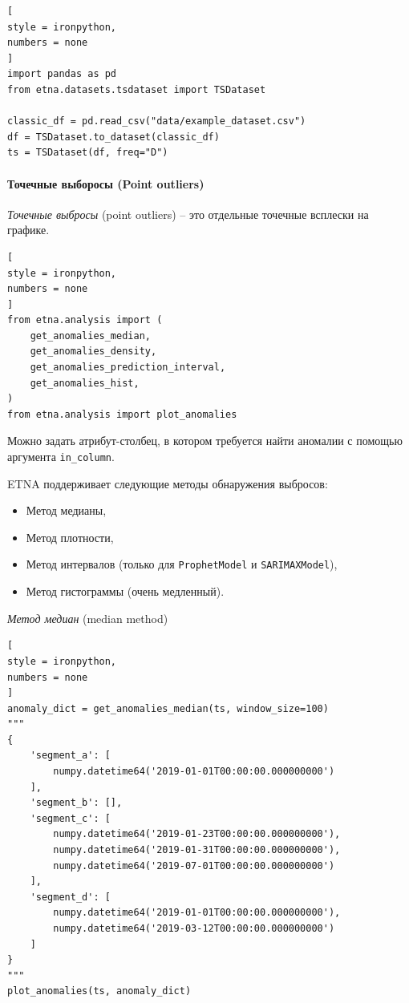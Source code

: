 \documentclass[%
	11pt,
	a4paper,
	utf8,
		]{article}
\begin{document}
\begin{lstlisting}[
style = ironpython,
numbers = none
]
import pandas as pd
from etna.datasets.tsdataset import TSDataset

classic_df = pd.read_csv("data/example_dataset.csv")
df = TSDataset.to_dataset(classic_df)
ts = TSDataset(df, freq="D")
\end{lstlisting}

\paragraph{Точечные выборосы (Point outliers)}

\emph{Точечные выбросы} (point outliers) -- это отдельные точечные всплески на графике.

\begin{lstlisting}[
style = ironpython,
numbers = none
]
from etna.analysis import (
	get_anomalies_median,
	get_anomalies_density,
	get_anomalies_prediction_interval,
	get_anomalies_hist,
)
from etna.analysis import plot_anomalies
\end{lstlisting}

Можно задать атрибут-столбец, в котором требуется найти аномалии с помощью аргумента \verb|in_column|.

ETNA поддерживает следующие методы обнаружения выбросов:
\begin{itemize}
	\item Метод медианы,
	
	\item Метод плотности,
	
	\item Метод интервалов (только для \verb|ProphetModel| и \verb|SARIMAXModel|),
	
	\item Метод гистограммы (очень медленный).
\end{itemize}

\emph{Метод медиан} (median method)
\begin{lstlisting}[
style = ironpython,
numbers = none
]
anomaly_dict = get_anomalies_median(ts, window_size=100)
"""
{
	'segment_a': [
	    numpy.datetime64('2019-01-01T00:00:00.000000000')
	],
	'segment_b': [],
	'segment_c': [
	    numpy.datetime64('2019-01-23T00:00:00.000000000'),
	    numpy.datetime64('2019-01-31T00:00:00.000000000'),
	    numpy.datetime64('2019-07-01T00:00:00.000000000')
	],
	'segment_d': [
	    numpy.datetime64('2019-01-01T00:00:00.000000000'),
	    numpy.datetime64('2019-03-12T00:00:00.000000000')
	]
}
"""
plot_anomalies(ts, anomaly_dict)
\end{lstlisting}
\end{document}
